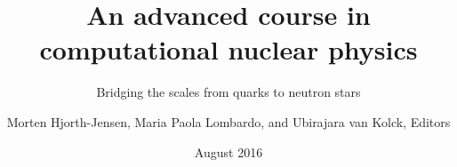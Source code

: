 \documentclass[oneside,graybox,envcountchap,sectrefs]{svmult}
\begin{document}
\frontmatter

\begin{titlepage}
\title{An advanced course in computational nuclear physics}
 \subtitle{Bridging the scales from quarks to neutron stars}
\date{August 2016}
\author{Morten Hjorth-Jensen, Maria Paola Lombardo, and Ubirajara van Kolck, Editors}
\end{titlepage}

\maketitle


\tableofcontents
\mainmatter











\end{document}
